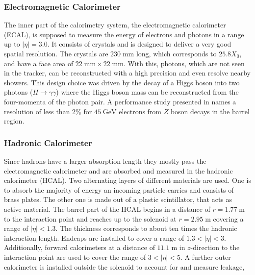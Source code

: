 \subsubsection{Electromagnetic Calorimeter}
	The inner part of the calorimetry system, the electromagnetic calorimeter (ECAL), is supposed to measure the energy of electrons and photons in a range up to $|\eta| = 3.0$. It consists of  crystals and is designed to deliver a very good spatial resolution. The crystals are $230\;\text{mm}$ long, which corresponds to $25.8 X_0$, and have a face area of $22\;\text{mm} \times 22\;\text{mm}$. With this, photons, which are not seen in the tracker, can be reconstructed with a high precision and even resolve nearby showers. This design choice was driven by the decay of a Higgs boson into two photons ($H\rightarrow \gamma \gamma$) where the Higgs boson mass can be reconstructed from the four-momenta of the photon pair. A performance study presented in \cite{EGammaPerformance} names a resolution of less than $2\%$ for $45\;\text{GeV}$ electrons from $Z$ boson decays in the barrel region.

\subsubsection{Hadronic Calorimeter}
	Since hadrons have a larger absorption length they mostly pass the electromagnetic calorimeter and are absorbed and measured in the hadronic calorimeter (HCAL). Two alternating layers of different materials are used. One is to absorb the majority of energy an incoming particle carries and consists of brass plates. The other one is made out of a plastic scintillator, that acts as active material. The barrel part of the HCAL begins in a distance of $r=1.77\;\text{m}$ to the interaction point and reaches up to the solenoid at $r=2.95\;\text{m}$ covering a range of $|\eta| < 1.3$. The thickness corresponds to about ten times the hadronic interaction length. Endcaps are installed to cover a range of $1.3 < |\eta| < 3$. Additionally, forward calorimeters at a distance of $11.1\;\text{m}$ in $z$-direction to the interaction point are used to cover the range of $3 < |\eta| < 5$. A further outer calorimeter is installed outside the solenoid to account for and measure leakage, 

 

